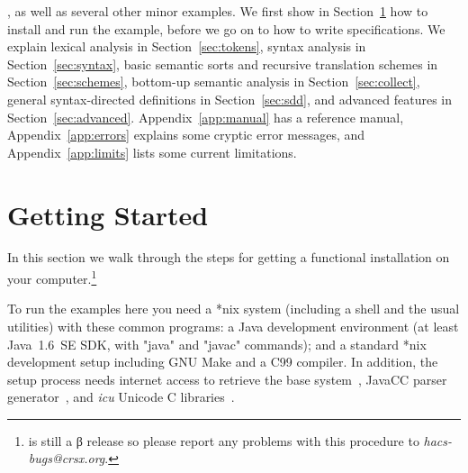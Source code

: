 \documentclass[11pt]{article} %
\begin{document}
\cite[Figure~1.7]{Aho+:2006}, as well as several other minor examples. %
We first show in Section~\ref{sec:run} how to install \HAX and run the example, before we go on to
how to write specifications. %
We explain lexical analysis in Section~\ref{sec:tokens}, %
syntax analysis in Section~\ref{sec:syntax}, %
basic semantic sorts and recursive translation schemes in Section~\ref{sec:schemes}, %
bottom-up semantic analysis in Section~\ref{sec:collect}, %
general syntax-directed definitions in Section~\ref{sec:sdd}, %
and advanced features in Section~\ref{sec:advanced}. %
Appendix~\ref{app:manual} has a reference manual, %
Appendix~\ref{app:errors} explains some cryptic error messages, %
and Appendix~\ref{app:limits} lists some current limitations.


\section{Getting Started}\label{sec:run}

In this section we walk through the steps for getting a functional \HAX installation on your
computer.\footnote{\HAX is still a β release so please report any problems with this procedure to
  \emph{hacs-bugs@crsx.org}.}

\begin{requirements}
  To run the \HAX examples here you need a *nix system (including a shell and the usual utilities)
  with these common programs: a Java development environment (at least Java~1.6~SE SDK, with "java"
  and "javac" commands); and a standard *nix development setup including GNU Make and a C99
  compiler. In addition, the setup process needs internet access to retrieve the \CRSX base
  system~\cite{crsx}, JavaCC parser generator~\cite{JavaCC}, and \emph{icu} Unicode C
  libraries~\cite{ICU}.
\end{requirements}
\end{document}
